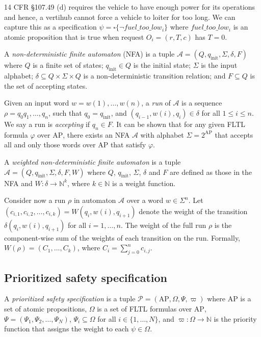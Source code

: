 \begin{eg}
 14 CFR \S 107.49 (d) requires the vehicle to have enough power for its operations and hence, a vertihub cannot force a vehicle to loiter for too long. We can capture this as a specification $\psi = \square \{\lnot fuel\_too\_low_i\} $ where $fuel\_too\_low_i$ is an atomic proposition that is true when request $O_i = (r,T,c)$ has $T = 0$.
\end{eg}



A \emph{non-deterministic finite automaton} (NFA) is a  tuple $\mathcal A = (Q,q_{\text{init}},\Sigma,\delta,F)$ where $Q$ is a finite set of states; $q_{\text{init}} \in Q$ is the initial state; $\Sigma$ is the input alphabet; $\delta \subseteq Q \times \Sigma \times Q$ is a non-deterministic transition relation; and $F \subseteq Q$ is the set of accepting states. 

Given an input word $w = w(1),\dots,w(n)$, a \emph{run} of $\mathcal A$ is a sequence $\rho = q_0q_1,\dots,q_n$, such that $q_0 = q_{\text{init}}$, and $(q_{i-1},w(i),q_i) \in \delta$ for all $1 \leq i \leq n$. We say a run is \emph{accepting} if $q_n \in F$. It can be shown that for any given FLTL formula $\varphi$ over $\text{AP}$, there exists an NFA $\mathcal{A}$ with alphabet $\Sigma = 2^{\text{AP}}$ that accepts all and only those words over $\text{AP}$ that satisfy $\varphi$. %

A \emph{weighted non-deterministic finite automaton} is a tuple $\mathcal A = (Q,q_{\text{init}},\Sigma,\delta,F,W)$ where $Q$, $q_{\text{init}}$, $\Sigma$, $\delta$ and $F$ are defined as those in the NFA and $W : \delta \rightarrow \mathbb{N}^k$, where $k \in \mathbb{N}$ is a weight function.  

Consider now a run $\rho$ in automaton $\mathcal A$ over a word $w \in \Sigma^{n}$. Let $\left(c_{i,1},c_{i,2},\dots,c_{i,k}\right) = W(q_{i},w(i),q_{i+1})$ denote the weight of the transition $\delta(q_{i},w(i),q_{i+1})$ for all $i = 1,\dots,n$. The weight of the full run $\rho$ is the component-wise sum of the weights of each transition on the run. Formally, $W(\rho) = \left(C_1,\dots,C_k \right)$, where $C_i = \sum_{j=0}^n c_{i,j}$.




\subsection{Prioritized safety specification}
A \emph{prioritized safety specification} is a tuple
$\mathcal{P} = (\text{AP}, \Omega, \Psi, \varpi)$ where
$\text{AP}$ is a set of atomic propositions,
$\Omega$ is a set of FLTL formulas over $\text{AP}$,
$\Psi = (\Psi_1, \Psi_2, \ldots, \Psi_N)$,
$\Psi_i \subseteq \Omega$
for all $i \in \{1, \ldots, N\}$,
and
$\varpi : \Omega \to \mathbb{N}$
is the priority function that assigns the weight to each
$\psi \in \Omega$.


